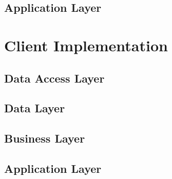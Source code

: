 \subsection{Application Layer}

\section{Client Implementation}
\subsection{Data Access Layer}
\subsection{Data Layer}
\subsection{Business Layer}
\subsection{Application Layer}


